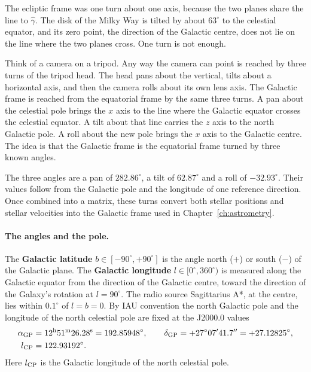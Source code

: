 The ecliptic frame was one turn about one axis, because the two planes share the line to $\hat\gamma$. The disk of the Milky Way is tilted by about $63^\circ$ to the celestial equator, and its zero point, the direction of the Galactic centre, does not lie on the line where the two planes cross. One turn is not enough.

Think of a camera on a tripod. Any way the camera can point is reached by three turns of the tripod head. The head pans about the vertical, tilts about a horizontal axis, and then the camera rolls about its own lens axis. The Galactic frame is reached from the equatorial frame by the same three turns. A pan about the celestial pole brings the $x$ axis to the line where the Galactic equator crosses the celestial equator. A tilt about that line carries the $z$ axis to the north Galactic pole. A roll about the new pole brings the $x$ axis to the Galactic centre. The idea is that the Galactic frame is the equatorial frame turned by three known angles.

The three angles are a pan of $282.86^\circ$, a tilt of $62.87^\circ$ and a roll of $-32.93^\circ$. Their values follow from the Galactic pole and the longitude of one reference direction. Once combined into a matrix, these turns convert both stellar positions and stellar velocities into the Galactic frame used in Chapter~\ref{ch:astrometry}.

\paragraph{The angles and the pole.} The \textbf{Galactic latitude} $b\in[-90^\circ,+90^\circ]$ is the angle north ($+$) or south ($-$) of the Galactic plane. The \textbf{Galactic longitude} $l\in[0^\circ,360^\circ)$ is measured along the Galactic equator from the direction of the Galactic centre, toward the direction of the Galaxy's rotation at $l=90^\circ$. The radio source Sagittarius A*, at the centre, lies within $0.1^\circ$ of $l=b=0$. By IAU convention the north Galactic pole and the longitude of the north celestial pole are fixed at the J2000.0 values
\begin{align}
	\alpha_{\rm GP} &= 12^{\rm h}51^{\rm m}26.28^{\rm s} = 192.85948^\circ, \qquad \delta_{\rm GP} = +27^\circ 07' 41.7'' = +27.12825^\circ, \nonumber\\
	l_{\rm CP} &= 122.93192^\circ .
\end{align}
Here $l_{\rm CP}$ is the Galactic longitude of the north celestial pole.

